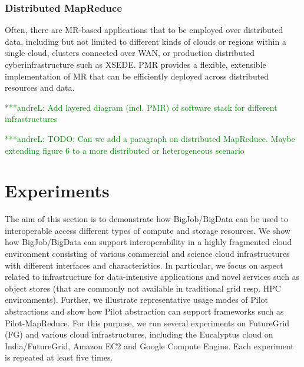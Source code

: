 \documentclass[times]{cpeauth}
\newcommand{\alnote}[1]{ {\textcolor{green} { ***andreL: #1 }}}
\newcommand{\alnote}[1]{}
\newcommand{\pilot}{Pilot\xspace}
\newcommand{\mrmg}{MR-Manager\xspace}
\begin{document}


\subsubsection*{Distributed MapReduce}

Often, there are MR-based applications that to be employed over distributed
data, including but not limited to different kinds of clouds or regions within
a single cloud, clusters connected over WAN, or production distributed
cyberinfrastructure such as XSEDE. PMR provides a flexible, extensible 
implementation of MR that can be efficiently deployed across distributed 
resources and data.



\alnote{Add layered diagram (incl. PMR) of software stack for different 
infrastructures}

\alnote{TODO: Can we add a paragraph on distributed MapReduce. Maybe extending 
figure 6 to a more distributed or heterogeneous scenario}


\section{Experiments}

The aim of this section is to demonstrate how BigJob/BigData can be used to
interoperable access different types of compute and storage resources. We show
how BigJob/BigData can support interoperability in a highly fragmented cloud
environment consisting of various commercial and science cloud infrastructures
with different interfaces and characteristics. In particular, we focus on
aspect related to infrastructure for data-intensive applications and novel
services such as object stores (that are commonly not available in traditional
grid resp. HPC environments). Further, we illustrate representative usage
modes of \pilot abstractions and show how \pilot abstraction can support
frameworks such as Pilot-MapReduce. For this purpose, we run several
experiments on FutureGrid (FG) and various cloud infrastructures, including
the Eucalyptus cloud on India/FutureGrid, Amazon EC2 and Google Compute
Engine. Each experiment is repeated at least five times.
\end{document}
